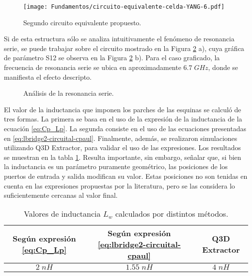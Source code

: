 \begin{figure}[h]
	\centering
	\texttt{[image: Fundamentos/circuito-equivalente-celda-YANG-6.pdf]}
	\caption{Segundo circuito equivalente propuesto.}
	\label{fig:modelo-circuital-con-lw}
\end{figure}

Si de esta estructura sólo se analiza intuitivamente el fenómeno de resonancia serie, se puede trabajar sobre el circuito mostrado en la Figura \ref{fig:p13-p14-sdf} a), cuya gráfica de parámetro S12 se observa en la Figura \ref{fig:p13-p14-sdf} b). Para el caso graficado, la frecuencia de resonancia serie se ubica en aproximadamente $6.7\; GHz$, donde se manifiesta el efecto descripto.

\begin{figure}[H]
	\centering 
	\hspace{0pt}
	\caption{Análisis de la resonancia serie.}
	\label{fig:p13-p14-sdf}
\end{figure}

El valor de la inductancia que imponen los parches de las esquinas se calculó de tres formas. La primera se basa en el uso de la expresión de la inductancia de la ecuación \ref{eq:Cp_Lp}. La segunda consiste en el uso de las ecuaciones presentadas en \ref{eq:lbridge2-circuital-cpaul}. Finalmente, además, se realizaron simulaciones utilizando Q3D Extractor, para validar el uso de las expresiones. Los resultados se muestran en la tabla \ref{table:lw}. Resulta importante, sin embargo, señalar que, si bien la inductancia es un parámetro puramente geométrico, las posiciones de los puertos de entrada y salida modifican su valor. Estas posiciones no son tenidas en cuenta en las expresiones propuestas por la literatura, pero se las considera lo suficientemente cercanas al valor final.

\begin{table}
	\centering
	\begin{tabular}{|c|c|c|}
		\hline 
		Según expresión \ref{eq:Cp_Lp} & Según expresión \ref{eq:lbridge2-circuital-cpaul} & Q3D Extractor \\ 
		\hline 
		$2\;nH$ & $1.55\;nH$ & $4\;nH$\\ 
		\hline 
	\end{tabular}
	\caption{Valores de inductancia $L_w$ calculados por distintos métodos.}
	\label{table:lw}
\end{table}

